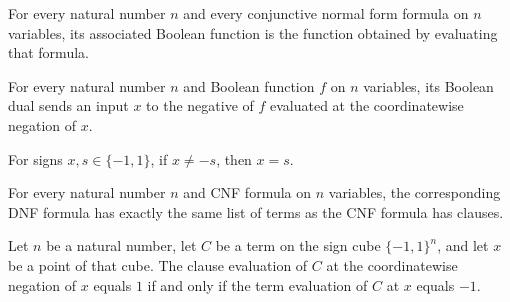 \begin{definition}
\label{FABL.CNFFormula.toBooleanFunction}
\leanok
{}
For every natural number $n$ and every conjunctive normal form formula on $n$ variables,
its associated Boolean function is the function obtained by evaluating that formula.
\end{definition}

\begin{definition}
\label{FABL.CNFFormula.booleanDual}
\leanok
{}
For every natural number $n$ and Boolean function $f$ on $n$ variables, its Boolean dual
sends an input $x$ to the negative of $f$ evaluated at the coordinatewise negation of
$x$.
\end{definition}

\begin{theorem}
\label{FABL.CNFFormula.sign_eq_of_ne_neg}
\leanok
{}
For signs $x,s\in\{-1,1\}$, if $x\ne -s$, then $x=s$.
\end{theorem}

\begin{definition}
\label{FABL.CNFFormula.switchAndOr}
\leanok
{}
For every natural number $n$ and CNF formula on $n$ variables, the corresponding DNF
formula has exactly the same list of terms as the CNF formula has clauses.
\end{definition}

\begin{theorem}
\label{FABL.CNFFormula.clauseEval_neg_iff_termEval}
\leanok
{}
Let $n$ be a natural number, let $C$ be a term on the sign cube $\{−1,1\}^n$, and let
$x$ be a point of that cube. The clause evaluation of $C$ at the coordinatewise negation
of $x$ equals $1$ if and only if the term evaluation of $C$ at $x$ equals $-1$.
\end{theorem}


